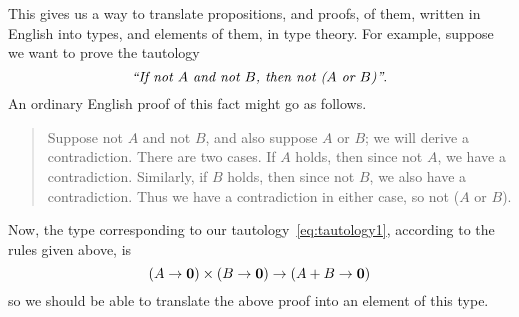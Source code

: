 This gives us a way to translate propositions, and proofs, of them, written in English into types, and elements of them, in type theory.
For example, suppose we want to prove the tautology
\begin{equation}\label{eq:tautology1}
  \text{\emph{``If not $A$ and not $B$, then not ($A$ or $B$)''}.}
\end{equation}
An ordinary English proof of this fact might go as follows.
\begin{quote}
  Suppose not $A$ and not $B$, and also suppose $A$ or $B$; we will derive a contradiction.
  There are two cases.
  If $A$ holds, then since not $A$, we have a contradiction.
  Similarly, if $B$ holds, then since not $B$, we also have a contradiction.
  Thus we have a contradiction in either case, so not ($A$ or $B$).
\end{quote}
Now, the type corresponding to our tautology~\eqref{eq:tautology1}, according to the rules given above, is
\begin{equation}\label{eq:tautology2}
  (A\to \emptyt) \times (B\to\emptyt) \to (A+B\to\emptyt)
\end{equation}
so we should be able to translate the above proof into an element of this type.

